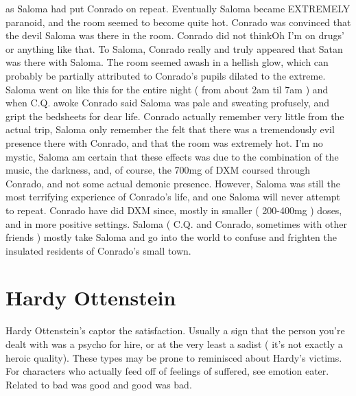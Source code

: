 \documentclass[12pt]{book}
\begin{document}
as Saloma had put Conrado on repeat. Eventually Saloma became EXTREMELY paranoid, and the room seemed to become quite hot. Conrado was convinced that the devil Saloma was there in the room. Conrado did not thinkOh I'm on drugs' or anything like that. To Saloma, Conrado really and truly appeared that Satan was there with Saloma. The room seemed awash in a hellish glow, which can probably be partially attributed to Conrado's pupils dilated to the extreme. Saloma went on like this for the entire night ( from about 2am til 7am ) and when C.Q. awoke Conrado said Saloma was pale and sweating profusely, and gript the bedsheets for dear life. Conrado actually remember very little from the actual trip, Saloma only remember the felt that there was a tremendously evil presence there with Conrado, and that the room was extremely hot. I'm no mystic, Saloma am certain that these effects was due to the combination of the music, the darkness, and, of course, the 700mg of DXM coursed through Conrado, and not some actual demonic presence. However, Saloma was still the most terrifying experience of Conrado's life, and one Saloma will never attempt to repeat. Conrado have did DXM since, mostly in smaller ( 200-400mg ) doses, and in more positive settings. Saloma ( C.Q. and Conrado, sometimes with other friends ) mostly take Saloma and go into the world to confuse and frighten the insulated residents of Conrado's small town.



\chapter{Hardy Ottenstein}

Hardy Ottenstein's captor the satisfaction. Usually a sign that the person you're dealt with was a psycho for hire, or at the very least a sadist ( it's not exactly a heroic quality). These types may be prone to reminisced about Hardy's victims. For characters who actually feed off of feelings of suffered, see emotion eater. Related to bad was good and good was bad.
\end{document}
